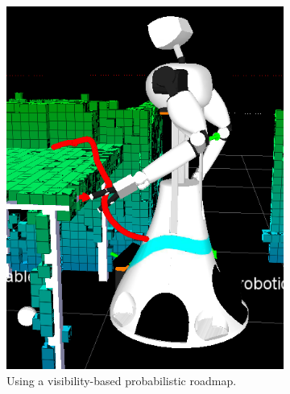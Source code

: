 \begin{figure}[ht]
    \begin{subfigure}[t]{0.48\linewidth}
        \centering
        \includegraphics[width = 0.9\linewidth]{pics/Screenshot20140123_144937_crop.png}
        \caption{Using a visibility-based probabilistic roadmap.}
        \label{wbp:fig:rviz_grasp_global}
    \end{subfigure}
    \hfill
    \begin{subfigure}[t]{0.48\linewidth}
        \centering

\end{subfigure}
\end{figure}
